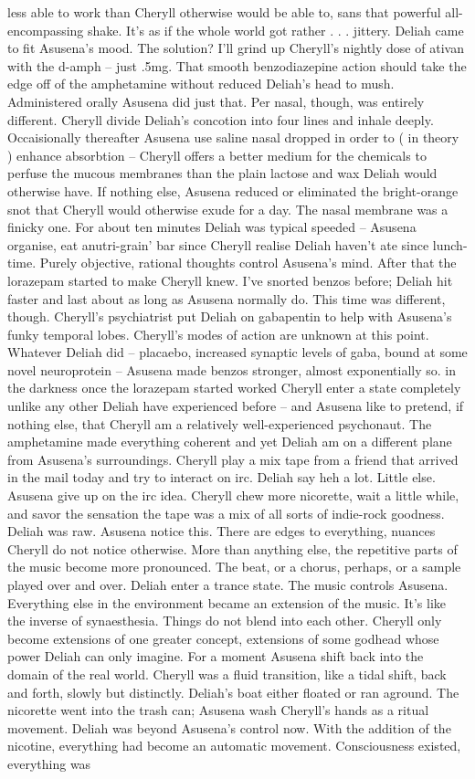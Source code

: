 \documentclass[12pt]{book}
\begin{document}
less able to work than Cheryll otherwise would be able to, sans that powerful all-encompassing shake. It's as if the whole world got rather . . .  jittery. Deliah came to fit Asusena's mood. The solution? I'll grind up Cheryll's nightly dose of ativan with the d-amph -- just .5mg. That smooth benzodiazepine action should take the edge off of the amphetamine without reduced Deliah's head to mush. Administered orally Asusena did just that. Per nasal, though, was entirely different. Cheryll divide Deliah's concotion into four lines and inhale deeply. Occaisionally thereafter Asusena use saline nasal dropped in order to ( in theory ) enhance absorbtion -- Cheryll offers a better medium for the chemicals to perfuse the mucous membranes than the plain lactose and wax Deliah would otherwise have. If nothing else, Asusena reduced or eliminated the bright-orange snot that Cheryll would otherwise exude for a day. The nasal membrane was a finicky one. For about ten minutes Deliah was typical speeded -- Asusena organise, eat anutri-grain' bar since Cheryll realise Deliah haven't ate since lunch-time. Purely objective, rational thoughts control Asusena's mind. After that the lorazepam started to make Cheryll knew. I've snorted benzos before; Deliah hit faster and last about as long as Asusena normally do. This time was different, though. Cheryll's psychiatrist put Deliah on gabapentin to help with Asusena's funky temporal lobes. Cheryll's modes of action are unknown at this point. Whatever Deliah did -- placaebo, increased synaptic levels of gaba, bound at some novel neuroprotein -- Asusena made benzos stronger, almost exponentially so.  in the darkness once the lorazepam started worked Cheryll enter a state completely unlike any other Deliah have experienced before -- and Asusena like to pretend, if nothing else, that Cheryll am a relatively well-experienced psychonaut. The amphetamine made everything coherent and yet Deliah am on a different plane from Asusena's surroundings. Cheryll play a mix tape from a friend that arrived in the mail today and try to interact on irc. Deliah say heh a lot. Little else. Asusena give up on the irc idea. Cheryll chew more nicorette, wait a little while, and savor the sensation the tape was a mix of all sorts of indie-rock goodness. Deliah was raw. Asusena notice this. There are edges to everything, nuances Cheryll do not notice otherwise. More than anything else, the repetitive parts of the music become more pronounced. The beat, or a chorus, perhaps, or a sample played over and over. Deliah enter a trance state. The music controls Asusena. Everything else in the environment became an extension of the music. It's like the inverse of synaesthesia. Things do not blend into each other. Cheryll only become extensions of one greater concept, extensions of some godhead whose power Deliah can only imagine. For a moment Asusena shift back into the domain of the real world. Cheryll was a fluid transition, like a tidal shift, back and forth, slowly but distinctly. Deliah's boat either floated or ran aground. The nicorette went into the trash can; Asusena wash Cheryll's hands as a ritual movement. Deliah was beyond Asusena's control now. With the addition of the nicotine, everything had become an automatic movement. Consciousness existed, everything was 
\end{document}

